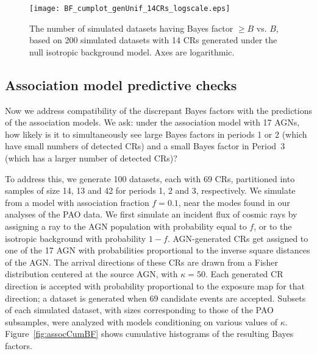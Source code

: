 \begin{figure}
\centerline{\texttt{[image: BF\_cumplot\_genUnif\_14CRs\_logscale.eps]}}
\caption{The number of simulated datasets having Bayes factor $\geq B$
vs. $B$, based on 200 simulated datasets with 14 CRs generated under the
null isotropic background model.  Axes are logarithmic.}
\label{fig:unifCumBF}
\end{figure}

\subsection{Association model predictive checks}

Now we address compatibility of the discrepant Bayes factors with the
predictions of the association models.  We ask: under the association model
with 17 AGNs, how likely is it to simultaneously see large Bayes factors in
periods 1 or 2 (which have small numbers of detected CRs) and a small Bayes
factor in Period~3 (which has a larger number of detected CRs)?

To address this, we generate 100 datasets, each with 69 CRs, partitioned
into samples of size 14, 13 and 42 for periods 1, 2 and 3, respectively.  We
simulate from a model with association fraction $f=0.1$, near the modes
found in our analyses of the PAO data.  We first simulate an incident flux
of cosmic rays by assigning a ray to the AGN population with probability
equal to $f$, or to the isotropic background with probability $1-f$.
AGN-generated CRs get assigned to one of the 17 AGN with probabilities
proportional to the inverse square distances of the AGN. The arrival
directions of these CRs are drawn from a Fisher distribution centered at the
source AGN, with $\kappa = 50$.  Each generated CR direction is accepted
with probability proportional to the exposure map for that direction; a
dataset is generated when 69 candidate events are accepted.  Subsets
of each simulated dataset, with sizes corresponding to those of the
PAO subsamples, were analyzed with models conditioning on various
values of $\kappa$.  Figure~\ref{fig:assocCumBF} shows cumulative
histograms of the resulting Bayes factors.

